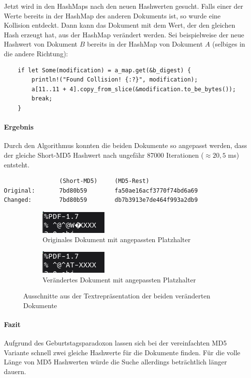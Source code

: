 Jetzt wird in den HashMaps nach den neuen Hashwerten gesucht. Falls einer der
Werte bereits in der HashMap des anderen Dokuments ist, so wurde eine Kollision entdeckt.
Dann kann das Dokument mit dem Wert, der den gleichen Hash erzeugt hat, aus der
HashMap verändert werden. Sei beispielweise der neue Hashwert von Dokument $B$ bereits
in der HashMap von Dokument $A$ (selbiges in die andere Richtung):
\begin{verbatim}
    if let Some(modification) = a_map.get(&b_digest) {
        println!("Found Collision! {:?}", modification);
        a[11..11 + 4].copy_from_slice(&modification.to_be_bytes());
        break;
    }
\end{verbatim}
\paragraph{Ergebnis}
Durch den Algorithmus konnten die beiden Dokumente so angepasst werden, dass der
gleiche Short-MD5 Hashwert nach ungefähr 87000 Iterationen ($\approx 20,5$ ms) entsteht.
\begin{verbatim}
                (Short-MD5)     (MD5-Rest)
Original:       7bd80b59        fa50ae16acf3770f74bd6a69
Changed:        7bd80b59        db7b3913e7de464f993a2db9
\end{verbatim}
\begin{figure}[h]
    \centering
    \begin{subfigure}[b]{0.4\textwidth}
        \centering
        \includegraphics[width=\textwidth]{img/org_adjusted}
        \caption{Originales Dokument mit angepassten Platzhalter}
    \end{subfigure}
    \hfill
    \begin{subfigure}[b]{0.4\textwidth}
        \centering
        \includegraphics[width=\textwidth]{img/chg_adjusted}
        \caption{Verändertes Dokument mit angepassten Platzhalter}
    \end{subfigure}
    \caption{Ausschnitte aus der Textrepräsentation der beiden veränderten Dokumente}
    \label{fig:adjusted_mietvertraege}
\end{figure}
\paragraph{Fazit}
Aufgrund des Geburtstagsparadoxon lassen sich bei der vereinfachten MD5 Variante
schnell zwei gleiche Hashwerte für die Dokumente finden. Für die volle Länge
von MD5 Hashwerten würde die Suche allerdings beträchtlich länger dauern. 